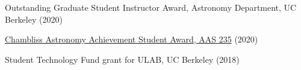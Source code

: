 \item[{\color{numcolor}\scriptsize3}] Outstanding Graduate Student Instructor Award, Astronomy Department, UC Berkeley (2020)

\item[{\color{numcolor}\scriptsize2}] \href{https://aas.org/grants-and-prizes/chambliss-astronomy-achievement-student-awards}{Chambliss Astronomy Achievement Student Award, AAS 235} (2020)


\item[{\color{numcolor}\scriptsize1}] Student Technology Fund grant for ULAB, UC Berkeley (2018)
